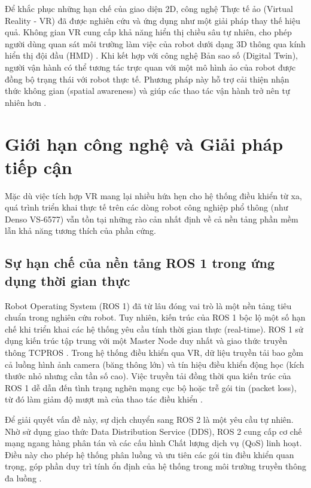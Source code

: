 Để khắc phục những hạn chế của giao diện 2D, công nghệ Thực tế ảo (Virtual Reality - VR) đã được nghiên cứu và ứng dụng như một giải pháp thay thế hiệu quả. Không gian VR cung cấp khả năng hiển thị chiều sâu tự nhiên, cho phép người dùng quan sát môi trường làm việc của robot dưới dạng 3D thông qua kính hiển thị đội đầu (HMD) \cite{arclab2025beavr}. Khi kết hợp với công nghệ Bản sao số (Digital Twin), người vận hành có thể tương tác trực quan với một mô hình ảo của robot được đồng bộ trạng thái với robot thực tế. Phương pháp này hỗ trợ cải thiện nhận thức không gian (spatial awareness) và giúp các thao tác vận hành trở nên tự nhiên hơn \cite{torrejon2026teleoperation}. 

\section{Giới hạn công nghệ và Giải pháp tiếp cận}
Mặc dù việc tích hợp VR mang lại nhiều hứa hẹn cho hệ thống điều khiển từ xa, quá trình triển khai thực tế trên các dòng robot công nghiệp phổ thông (như Denso VS-6577) vẫn tồn tại những rào cản nhất định về cả nền tảng phần mềm lẫn khả năng tương thích của phần cứng.

\subsection{Sự hạn chế của nền tảng ROS 1 trong ứng dụng thời gian thực}
Robot Operating System (ROS 1) đã từ lâu đóng vai trò là một nền tảng tiêu chuẩn trong nghiên cứu robot. Tuy nhiên, kiến trúc của ROS 1 bộc lộ một số hạn chế khi triển khai các hệ thống yêu cầu tính thời gian thực (real-time). ROS 1 sử dụng kiến trúc tập trung với một Master Node duy nhất và giao thức truyền thông TCPROS \cite{macenski2022robot}. Trong hệ thống điều khiển qua VR, dữ liệu truyền tải bao gồm cả luồng hình ảnh camera (băng thông lớn) và tín hiệu điều khiển động học (kích thước nhỏ nhưng cần tần số cao). Việc truyền tải đồng thời qua kiến trúc của ROS 1 dễ dẫn đến tình trạng nghẽn mạng cục bộ hoặc trễ gói tin (packet loss), từ đó làm giảm độ mượt mà của thao tác điều khiển \cite{kawshan2026digital, casini2025survey}. 

Để giải quyết vấn đề này, sự dịch chuyển sang ROS 2 là một yêu cầu tự nhiên. Nhờ sử dụng giao thức Data Distribution Service (DDS), ROS 2 cung cấp cơ chế mạng ngang hàng phân tán và các cấu hình Chất lượng dịch vụ (QoS) linh hoạt. Điều này cho phép hệ thống phân luồng và ưu tiên các gói tin điều khiển quan trọng, góp phần duy trì tính ổn định của hệ thống trong môi trường truyền thông đa luồng \cite{macenski2022robot, ali2025digital}.

